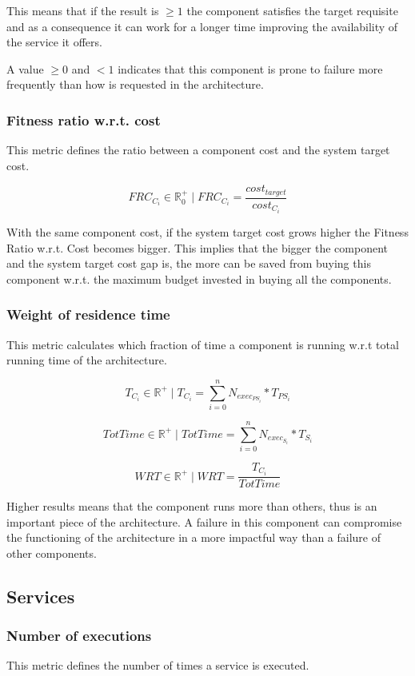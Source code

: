 This means that if the result is $\ge 1$ the component satisfies the target requisite and as a consequence it can work for a longer time improving the availability of the service it offers. 

A value $\ge 0 $ and $<1$ indicates that this component is prone to failure more frequently than how is requested in the architecture.

\subsubsection{Fitness ratio w.r.t. cost}
This metric defines the ratio between a component cost and the system target cost. 

\[ FRC_{C_i} \in \mathbb{R}^+_0 \; | \; FRC_{C_i} = \frac{cost_{target}}{cost_{C_i}}\]

With the same component cost, if the system target cost grows higher the Fitness Ratio w.r.t. Cost becomes bigger. This implies that the bigger the component and the system target cost gap is, the more can be saved from buying this component w.r.t. the maximum budget invested in buying all the components.

\subsubsection{Weight of residence time}
This metric calculates which fraction of time a component is running w.r.t total running time of the architecture.

\[ T_{C_i} \in \mathbb{R}^+ \; | \; T_{C_i} = \sum_{i=0}^{n} N_{exec_{PS_i}} * T_{PS_i} \]

\[ TotTime \in \mathbb{R^+} \; | \; TotTime = \sum_{i=0}^{n}N_{exec_{S_i}} * T_{S_i} \]

\[ WRT \in \mathbb{R}^+ \; | \; WRT = \frac{T_{C_i}}{TotTime} \]

Higher results means that the component runs more than others, thus is an important piece of the architecture. A failure in this component can compromise the functioning of the architecture in a more impactful way than a failure of other components.

\subsection{Services}
\subsubsection{Number of executions}
This metric defines the number of times a service is executed.

